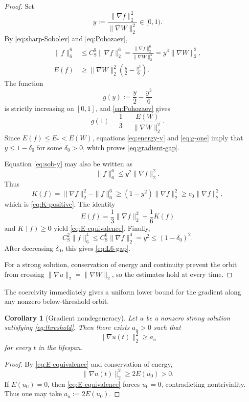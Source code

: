 \documentclass{interact}
\numberwithin{equation}{section}
\theoremstyle{plain}
\newtheorem{corollary}[theorem]{Corollary}
\theoremstyle{definition}
\theoremstyle{remark}
\newcommand{\cS}{C_{\mathrm S}}
\begin{document}
\begin{proof}
Set
\[
 y:=\frac{\|\nabla f\|_2^2}{\|\nabla W\|_2^2}\in[0,1).
\]
By \eqref{eq:sharp-Sobolev} and \eqref{eq:Pohozaev},
\begin{align}
 \|f\|_6^6
 &\le \cS^6\|\nabla f\|_2^6
 =\frac{\|\nabla f\|_2^6}{\|\nabla W\|_2^4}
 =y^3\|\nabla W\|_2^2,
 \label{eq:sob-y}\\
 E(f)
 &\ge \|\nabla W\|_2^2
 \left(\frac y2-\frac{y^3}{6}\right).
 \label{eq:energy-y}
\end{align}
The function
\[
 g(y):=\frac y2-\frac{y^3}{6}
\]
is strictly increasing on $[0,1]$, and \eqref{eq:Pohozaev} gives
\begin{equation}\label{eq:g-one}
 g(1)=\frac13=\frac{E(W)}{\|\nabla W\|_2^2}.
\end{equation}
Since $E(f)\le E_*<E(W)$, equations \eqref{eq:energy-y} and \eqref{eq:g-one} imply that $y\le1-\delta_0$ for some $\delta_0>0$, which proves \eqref{eq:gradient-gap}.

Equation \eqref{eq:sob-y} may also be written as
\[
 \|f\|_6^6\le y^2\|\nabla f\|_2^2.
\]
Thus
\[
 K(f)
 =\|\nabla f\|_2^2-\|f\|_6^6
 \ge(1-y^2)\|\nabla f\|_2^2
 \ge c_0\|\nabla f\|_2^2,
\]
which is \eqref{eq:K-positive}. The identity
\[
 E(f)=\frac13\|\nabla f\|_2^2+\frac16K(f)
\]
and $K(f)\ge0$ yield \eqref{eq:E-equivalence}. Finally,
\[
 \cS^2\|f\|_6^4
 \le \cS^6\|\nabla f\|_2^4
 =y^2
 \le(1-\delta_0)^2.
\]
After decreasing $\delta_0$, this gives \eqref{eq:L6-gap}.

For a strong solution, conservation of energy and continuity prevent the orbit from crossing $\|\nabla u\|_2=\|\nabla W\|_2$, so the estimates hold at every time.
\end{proof}

The coercivity immediately gives a uniform lower bound for the gradient along any nonzero below-threshold orbit.

\begin{corollary}[Gradient nondegeneracy]\label{cor:gradient-nondegenerate}
Let $u$ be a nonzero strong solution satisfying \eqref{eq:threshold}. Then there exists $a_u>0$ such that
\[
 \|\nabla u(t)\|_2^2\ge a_u
\]
for every $t$ in the lifespan.
\end{corollary}

\begin{proof}
By \eqref{eq:E-equivalence} and conservation of energy,
\[
 \|\nabla u(t)\|_2^2\ge2E(u_0)>0.
\]
If $E(u_0)=0$, then \eqref{eq:E-equivalence} forces $u_0=0$, contradicting nontriviality. Thus one may take $a_u:=2E(u_0)$.
\end{proof}
\end{document}
